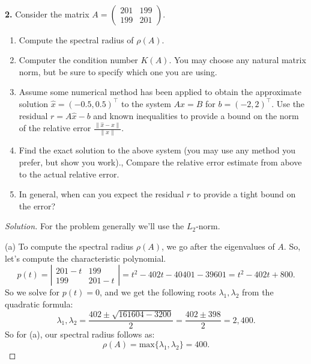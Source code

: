\documentclass[12pt]{amsart}
\newenvironment{solution}
{\begin{proof}[Solution]}
{\end{proof}}
\begin{document}
\begin{onehalfspace}
        \quad\\
        \noindent\textbf{2.} Consider the matrix $A = \left(\begin{matrix}201 & 199\\199 & 201\end{matrix}\right)$.
        \begin{enumerate}[label=(\alph*)]
            \item Compute the spectral radius of $\rho(A)$.
            \item Computer the condition number $K(A)$.
                  You may choose any natural matrix norm, but be sure to specify which one you are using.
            \item Assume some numerical method has been applied to obtain the approximate solution $\hat{x} = (-0.5,0.5)^\top$
                  to the system $Ax = B$ for $b = (-2,2)^\top$.
                  Use the residual $r=A\hat{x} - b$ and known inequalities to provide a bound on the norm of the
                  relative error $\frac{\|\hat{x} - x\|}{\|x\|}$.
            \item Find the exact solution to the above system (you may use any method you prefer, but show you work).,
                  Compare the relative error estimate from above to the actual relative error.
            \item In general, when can you expect the residual $r$ to provide a tight bound on the error?
        \end{enumerate}
        \begin{solution}
            For the problem generally we'll use the $L_2$-norm.

            (a) To compute the spectral radius $\rho(A)$, we go after the eigenvalues of $A$.
            So, let's compute the characteristic polynomial.
            \begin{displaymath}
                p(t) = \left|\begin{matrix}
                                 201-t & 199\\
                                 199 & 201 -t
                \end{matrix}\right| = t^2-402t-40401-39601 = t^2-402t+800.
            \end{displaymath}
            So we solve for $p(t)=0$, and we get the following roots $\lambda_1,\lambda_2$ from the quadratic formula:
            \begin{displaymath}
                \lambda_1,\lambda_2 = \frac{402\pm\sqrt{161604-3200}}{2} = \frac{402\pm 398}{2} = 2, 400.
            \end{displaymath}
            So for (a), our spectral radius follows as:
            \begin{displaymath}
                \rho(A) = \text{max}\{\lambda_1,\lambda_2\} = 400.
            \end{displaymath}


\end{solution}
\end{onehalfspace}
\end{document}

